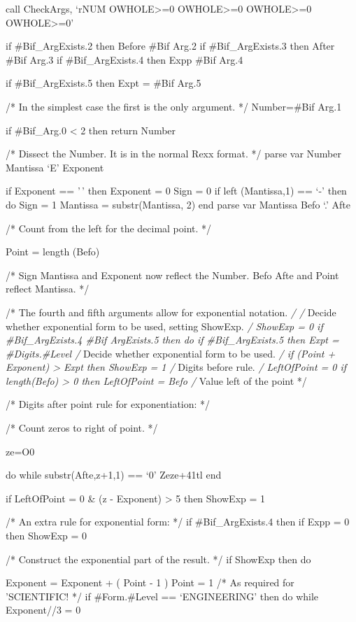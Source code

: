 call CheckArgs, `rNUM OWHOLE\textgreater=0 OWHOLE\textgreater=0
OWHOLE\textgreater=0 OWHOLE\textgreater=0'

if \#Bif\_ArgExists.2 then Before \#Bif Arg.2 if \#Bif\_ArgExists.3 then
After \#Bif Arg.3 if \#Bif\_ArgExists.4 then Expp \#Bif Arg.4

if \#Bif\_ArgExists.5 then Expt = \#Bif Arg.5

/* In the simplest case the first is the only argument. */ Number=\#Bif
Arg.1

if \#Bif\_Arg.0 \textless{} 2 then return Number

/* Dissect the Number. It is in the normal Rexx format. */ parse var
Number Mantissa `E' Exponent

if Exponent == '\,' then Exponent = 0 Sign = 0 if left (Mantissa,1) ==
`-' then do Sign = 1 Mantissa = substr(Mantissa, 2) end parse var
Mantissa Befo `.' Afte

/* Count from the left for the decimal point. */

Point = length (Befo)

/* Sign Mantissa and Exponent now reflect the Number. Befo Afte and
Point reflect Mantissa. */

/* The fourth and fifth arguments allow for exponential notation.
\emph{/ /} Decide whether exponential form to be used, setting ShowExp.
\emph{/ ShowExp = 0 if \#Bif\_ArgExists.4 \#Bif ArgExists.5 then do if
\#Bif\_ArgExists.5 then Expt = \#Digits.\#Level /} Decide whether
exponential form to be used. \emph{/ if (Point + Exponent)
\textgreater{} Expt then ShowExp = 1 /} Digits before rule. \emph{/
LeftOfPoint = 0 if length(Befo) \textgreater{} 0 then LeftOfPoint = Befo
/} Value left of the point */

/* Digits after point rule for exponentiation: */

/* Count zeros to right of point. */

ze=O0

do while substr(Afte,z+1,1) == `0' Zeze+41tl end

if LeftOfPoint = 0 \& (z - Exponent) \textgreater{} 5 then ShowExp = 1

/* An extra rule for exponential form: */ if \#Bif\_ArgExists.4 then if
Expp = 0 then ShowExp = 0

/* Construct the exponential part of the result. */ if ShowExp then do

Exponent = Exponent + ( Point - 1 ) Point = 1 /* As required for
'SCIENTIFIC! */ if \#Form.\#Level == `ENGINEERING' then do while
Exponent//3 = 0

